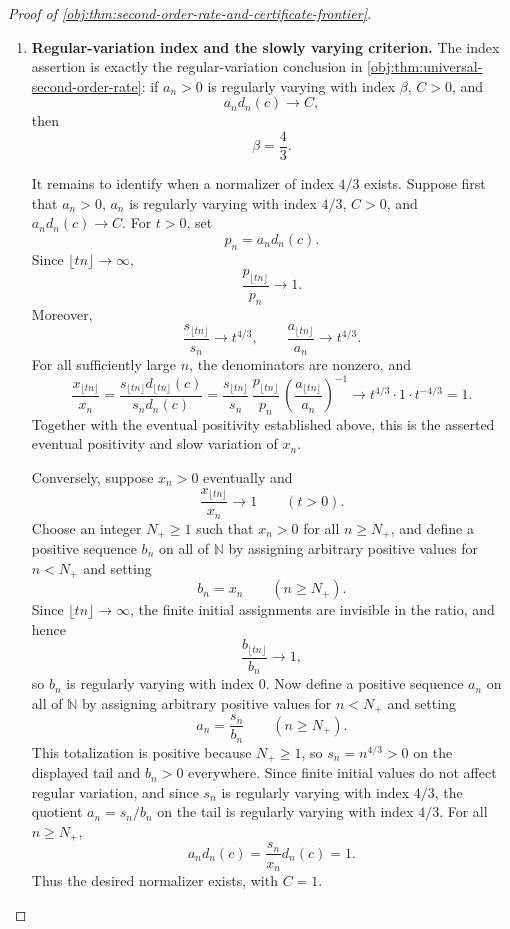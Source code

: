 \begin{proof}[Proof of \cref{obj:thm:second-order-rate-and-certificate-frontier}]
\begin{enumerate}
\item \textbf{Regular-variation index and the slowly varying criterion.}
The index assertion is exactly the regular-variation conclusion in \cref{obj:thm:universal-second-order-rate}: if \(a_n>0\) is regularly varying with index \(\beta\), \(C>0\), and
\[
a_n d_n(c)\to C,
\]
then
\[
\beta=\frac43.
\]

It remains to identify when a normalizer of index \(4/3\) exists. Suppose first that \(a_n>0\), \(a_n\) is regularly varying with index \(4/3\), \(C>0\), and \(a_n d_n(c)\to C\). For \(t>0\), set
\[
p_n=a_n d_n(c).
\]
Since \(\lfloor tn\rfloor\to\infty\),
\[
\frac{p_{\lfloor tn\rfloor}}{p_n}\to1.
\]
Moreover,
\[
\frac{s_{\lfloor tn\rfloor}}{s_n}\to t^{4/3},
\qquad
\frac{a_{\lfloor tn\rfloor}}{a_n}\to t^{4/3}.
\]
For all sufficiently large \(n\), the denominators are nonzero, and
\[
\frac{x_{\lfloor tn\rfloor}}{x_n}
=
\frac{s_{\lfloor tn\rfloor}d_{\lfloor tn\rfloor}(c)}
{s_nd_n(c)}
=
\frac{s_{\lfloor tn\rfloor}}{s_n}\,
\frac{p_{\lfloor tn\rfloor}}{p_n}\,
\left(\frac{a_{\lfloor tn\rfloor}}{a_n}\right)^{-1}
\longrightarrow
t^{4/3}\cdot1\cdot t^{-4/3}=1.
\]
Together with the eventual positivity established above, this is the asserted eventual positivity and slow variation of \(x_n\).

Conversely, suppose \(x_n>0\) eventually and
\[
\frac{x_{\lfloor tn\rfloor}}{x_n}\to1
\qquad(t>0).
\]
Choose an integer \(N_+\ge1\) such that \(x_n>0\) for all \(n\ge N_+\), and define a positive sequence \(b_n\) on all of \(\mathbb N\) by assigning arbitrary positive values for \(n<N_+\) and setting
\[
b_n=x_n
\qquad(n\ge N_+).
\]
Since \(\lfloor tn\rfloor\to\infty\), the finite initial assignments are invisible in the ratio, and hence
\[
\frac{b_{\lfloor tn\rfloor}}{b_n}\to1,
\]
so \(b_n\) is regularly varying with index \(0\). Now define a positive sequence \(a_n\) on all of \(\mathbb N\) by assigning arbitrary positive values for \(n<N_+\) and setting
\[
a_n=\frac{s_n}{b_n}
\qquad(n\ge N_+).
\]
This totalization is positive because \(N_+\ge1\), so \(s_n=n^{4/3}>0\) on the displayed tail and \(b_n>0\) everywhere. Since finite initial values do not affect regular variation, and since \(s_n\) is regularly varying with index \(4/3\), the quotient \(a_n=s_n/b_n\) on the tail is regularly varying with index \(4/3\). For all \(n\ge N_+\),
\[
a_n d_n(c)
=
\frac{s_n}{x_n}d_n(c)
=
1.
\]
Thus the desired normalizer exists, with \(C=1\). %


\end{enumerate}
\end{proof}
